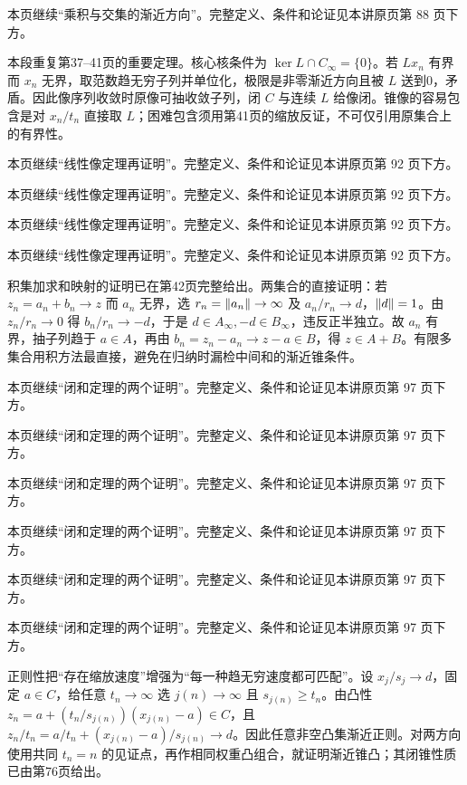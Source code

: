 本页继续“乘积与交集的渐近方向”。完整定义、条件和论证见本讲原页第 88 页下方。

本段重复第37--41页的重要定理。核心核条件为 $\ker L\cap C_\infty=\{0\}$。若 $Lx_n$ 有界而 $x_n$ 无界，取范数趋无穷子列并单位化，极限是非零渐近方向且被 $L$ 送到0，矛盾。因此像序列收敛时原像可抽收敛子列，闭 $C$ 与连续 $L$ 给像闭。锥像的容易包含是对 $x_n/t_n$ 直接取 $L$；困难包含须用第41页的缩放反证，不可仅引用原集合上的有界性。

本页继续“线性像定理再证明”。完整定义、条件和论证见本讲原页第 92 页下方。

本页继续“线性像定理再证明”。完整定义、条件和论证见本讲原页第 92 页下方。

本页继续“线性像定理再证明”。完整定义、条件和论证见本讲原页第 92 页下方。

本页继续“线性像定理再证明”。完整定义、条件和论证见本讲原页第 92 页下方。

积集加求和映射的证明已在第42页完整给出。两集合的直接证明：若 $z_n=a_n+b_n\to z$ 而 $a_n$ 无界，选 $r_n=\left\lVert a_n\right\rVert\to\infty$ 及 $a_n/r_n\to d$，$\left\lVert d\right\rVert=1$。由 $z_n/r_n\to0$ 得 $b_n/r_n\to-d$，于是 $d\in A_\infty,-d\in B_\infty$，违反正半独立。故 $a_n$ 有界，抽子列趋于 $a\in A$，再由 $b_n=z_n-a_n\to z-a\in B$，得 $z\in A+B$。有限多集合用积方法最直接，避免在归纳时漏检中间和的渐近锥条件。

本页继续“闭和定理的两个证明”。完整定义、条件和论证见本讲原页第 97 页下方。

本页继续“闭和定理的两个证明”。完整定义、条件和论证见本讲原页第 97 页下方。

本页继续“闭和定理的两个证明”。完整定义、条件和论证见本讲原页第 97 页下方。

本页继续“闭和定理的两个证明”。完整定义、条件和论证见本讲原页第 97 页下方。

本页继续“闭和定理的两个证明”。完整定义、条件和论证见本讲原页第 97 页下方。

本页继续“闭和定理的两个证明”。完整定义、条件和论证见本讲原页第 97 页下方。

正则性把“存在缩放速度”增强为“每一种趋无穷速度都可匹配”。设 $x_j/s_j\to d$，固定 $a\in C$，给任意 $t_n\to\infty$ 选 $j(n)\to\infty$ 且 $s_{j(n)}\ge t_n$。由凸性 $z_n=a+(t_n/s_{j(n)})(x_{j(n)}-a)\in C$，且 $z_n/t_n=a/t_n+(x_{j(n)}-a)/s_{j(n)}\to d$。因此任意非空凸集渐近正则。对两方向使用共同 $t_n=n$ 的见证点，再作相同权重凸组合，就证明渐近锥凸；其闭锥性质已由第76页给出。

